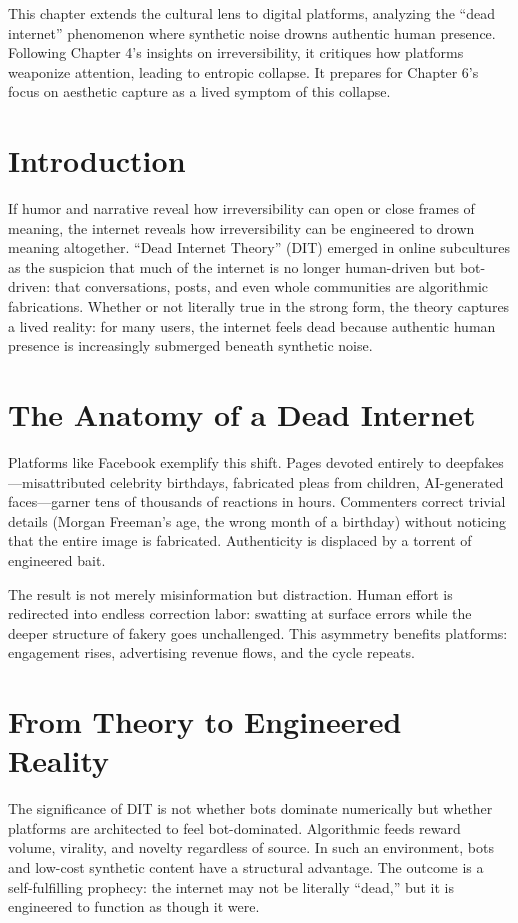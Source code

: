 \documentclass{book}
\begin{document}
This chapter extends the cultural lens to digital platforms, analyzing the ``dead internet'' phenomenon where synthetic noise drowns authentic human presence. Following Chapter 4’s insights on irreversibility, it critiques how platforms weaponize attention, leading to entropic collapse. It prepares for Chapter 6’s focus on aesthetic capture as a lived symptom of this collapse.

\section{Introduction}

If humor and narrative reveal how irreversibility can open or close frames of meaning, the internet reveals how irreversibility can be engineered to drown meaning altogether. ``Dead Internet Theory'' (DIT) emerged in online subcultures as the suspicion that much of the internet is no longer human-driven but bot-driven: that conversations, posts, and even whole communities are algorithmic fabrications. Whether or not literally true in the strong form, the theory captures a lived reality: for many users, the internet feels dead because authentic human presence is increasingly submerged beneath synthetic noise.

\section{The Anatomy of a Dead Internet}

Platforms like Facebook exemplify this shift. Pages devoted entirely to deepfakes—misattributed celebrity birthdays, fabricated pleas from children, AI-generated faces—garner tens of thousands of reactions in hours. Commenters correct trivial details (Morgan Freeman’s age, the wrong month of a birthday) without noticing that the entire image is fabricated. Authenticity is displaced by a torrent of engineered bait.

The result is not merely misinformation but distraction. Human effort is redirected into endless correction labor: swatting at surface errors while the deeper structure of fakery goes unchallenged. This asymmetry benefits platforms: engagement rises, advertising revenue flows, and the cycle repeats.

\section{From Theory to Engineered Reality}

The significance of DIT is not whether bots dominate numerically but whether platforms are architected to feel bot-dominated. Algorithmic feeds reward volume, virality, and novelty regardless of source. In such an environment, bots and low-cost synthetic content have a structural advantage. The outcome is a self-fulfilling prophecy: the internet may not be literally ``dead,'' but it is engineered to function as though it were.
\end{document}
